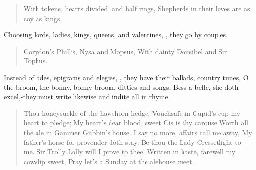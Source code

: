 \begin{verse}%
With tokens, hearts divided, and half rings,
Shepherds in their loves are as coy as kings.
\end{verse}%

Choosing lords, ladies, kings, queens, and valentines, \etc{}, they go by
couples,

\begin{verse}%
Corydon's Phillis, Nysa and Mopsus,
With dainty Dousibel and Sir Tophus.
\end{verse}%

Instead of odes, epigrams and elegies, \etc{}, they have their ballads,
country tunes, O the broom, the bonny, bonny broom, ditties and songs,
Bess a belle, she doth excel,-they must write likewise and indite all
in rhyme.

\begin{verse}%
Thou honeysuckle of the hawthorn hedge,
Vouchsafe in Cupid's cup my heart to pledge;
My heart's dear blood, sweet Cis is thy carouse
Worth all the ale in Gammer Gubbin's house.
I say no more, affairs call me away,
My father's horse for provender doth stay.
Be thou the Lady Cressetlight to me.
Sir Trolly Lolly will I prove to thee.
Written in haste, farewell my cowslip sweet,
Pray let's a Sunday at the alehouse meet.
\end{verse}%


